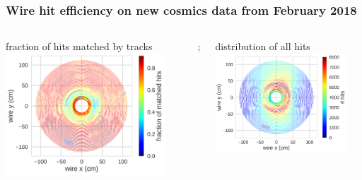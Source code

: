 \documentclass[18pt, aspectratio=169]{beamer}
\begin{document}
\begin{frame}
  \frametitle{Wire hit efficiency on  new cosmics data from February 2018}
  \begin{columns}
    \begin{column}{0.5\textwidth}
      \centering
      fraction of hits matched by tracks
      \includegraphics[width=0.9\textwidth]{figures/hit_efficiency_by_wire/gcr2/r00304/hit_ratio_matched_by_recotrack.png}
    \end{column}
    ;\begin{column}{0.5\textwidth}
      \centering distribution of all hits\\
      \includegraphics[width=0.9\textwidth]{figures/hit_efficiency_by_wire/gcr2/r00304/total_hits_per_wire.png}
    \end{column}
  \end{columns}
\end{frame}
\end{document}
